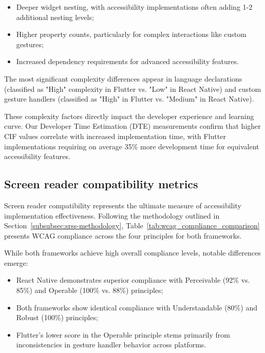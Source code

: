 \begin{itemize}
    \item Deeper widget nesting, with accessibility implementations often adding 1-2 additional nesting levels;
    \item Higher property counts, particularly for complex interactions like custom gestures;
    \item Increased dependency requirements for advanced accessibility features.
\end{itemize}

The most significant complexity differences appear in language declarations (classified as "High" complexity in Flutter vs. "Low" in React Native) and custom gesture handlers (classified as "High" in Flutter vs. "Medium" in React Native).

These complexity factors directly impact the developer experience and learning curve. Our Developer Time Estimation (DTE) measurements confirm that higher CIF values correlate with increased implementation time, with Flutter implementations requiring on average 35\% more development time for equivalent accessibility features.

\subsection{Screen reader compatibility metrics}
\label{subsec:screen-reader-metrics}

Screen reader compatibility represents the ultimate measure of accessibility implementation effectiveness. Following the methodology outlined in Section~\ref{subsubsec:srss-methodology}, Table~\ref{tab:wcag_compliance_comparison} presents WCAG compliance across the four principles for both frameworks.

While both frameworks achieve high overall compliance levels, notable differences emerge:

\begin{itemize}
    \item React Native demonstrates superior compliance with Perceivable (92\% vs. 85\%) and Operable (100\% vs. 88\%) principles;
    \item Both frameworks show identical compliance with Understandable (80\%) and Robust (100\%) principles;
    \item Flutter's lower score in the Operable principle stems primarily from inconsistencies in gesture handler behavior across platforms.
\end{itemize}

